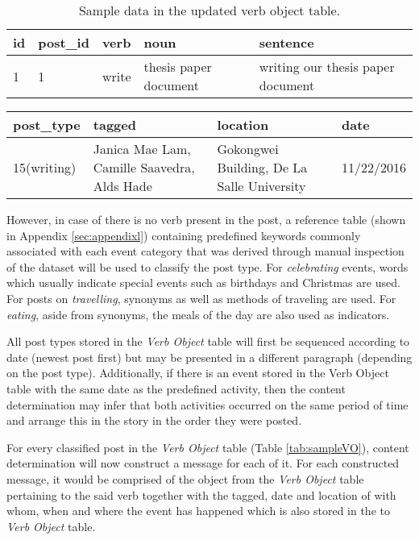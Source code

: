 \clearpage
\begin{table}[ph!]   
\centering
\caption{Sample data in the updated verb object table.} \vspace{0.25em}
\begin{tabular}{|p{1cm}|p{1in}|p{1.5cm}|p{1in}|p{1in}|} \hline
\textbf{id} & \textbf{post\_id} & \textbf{verb} & \textbf{noun} & \textbf{sentence}\\ \hline
1&1&write&thesis paper document&writing our thesis paper document \\ \hline
\end{tabular}
\label{tab:sampleUpVO}
\end{table}
\begin{table}[ph!]   
\centering
\begin{tabular}{|p{1in}|p{1.2in}|p{1.2in}|p{1in}|} \hline
\textbf{post\_type} & \textbf{tagged}& \textbf{location} & \textbf{date}\\ \hline
15(writing)&Janica Mae Lam, Camille Saavedra, Alds Hade&Gokongwei Building, De La Salle University& 11/22/2016 \\ \hline
\end{tabular}
\end{table}

However, in case of there is no verb present in the post, a reference table (shown in Appendix \ref{sec:appendixl}) containing predefined keywords commonly associated with each event category that was derived through manual inspection of the dataset will be used to classify the post type. For \textit{celebrating} events, words which usually indicate special events such as birthdays and Christmas are used. For posts on \textit{travelling}, synonyms as well as methods of traveling are used. For \textit{eating}, aside from synonyms, the meals of the day are also used as indicators.

All post types stored in the \textit{Verb Object} table will first be sequenced according to date (newest post first) but may be presented in a different paragraph (depending on the post type). Additionally, if there is an event stored in the Verb Object table with the same date as the predefined activity, then the content determination may infer that both activities occurred on the same period of time and arrange this in the story in the order they were posted.

For every classified post in the \textit{Verb Object} table (Table \ref{tab:sampleVO}), content determination will now construct a message for each of it. For each constructed message, it would be comprised of the object from the \textit{Verb Object} table pertaining to the said verb together with the tagged, date and location of with whom, when and where the event has happened which is also stored in the to \textit{Verb Object} table.

